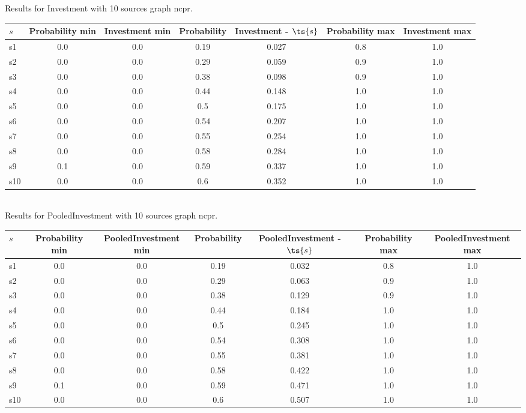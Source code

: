 \documentclass{article}
\begin{document}
\noindent Results for Investment with 10 sources graph ncpr.

\noindent\begin{tabular}{|l|c|c|c|c|c|c|}
\hline
$s$& Probability min & Investment min & Probability & Investment - $\ts{s}$ & Probability max & Investment max\\
\hline
s1 &0.0 & 0.0 & 0.19 & 0.027 & 0.8 & 1.0\\
\hline
s2 &0.0 & 0.0 & 0.29 & 0.059 & 0.9 & 1.0\\
\hline
s3 &0.0 & 0.0 & 0.38 & 0.098 & 0.9 & 1.0\\
\hline
s4 &0.0 & 0.0 & 0.44 & 0.148 & 1.0 & 1.0\\
\hline
s5 &0.0 & 0.0 & 0.5 & 0.175 & 1.0 & 1.0\\
\hline
s6 &0.0 & 0.0 & 0.54 & 0.207 & 1.0 & 1.0\\
\hline
s7 &0.0 & 0.0 & 0.55 & 0.254 & 1.0 & 1.0\\
\hline
s8 &0.0 & 0.0 & 0.58 & 0.284 & 1.0 & 1.0\\
\hline
s9 &0.1 & 0.0 & 0.59 & 0.337 & 1.0 & 1.0\\
\hline
s10 &0.0 & 0.0 & 0.6 & 0.352 & 1.0 & 1.0\\
\hline
\end{tabular}\\

\noindent Results for PooledInvestment with 10 sources graph ncpr.

\noindent\begin{tabular}{|l|c|c|c|c|c|c|}
\hline
$s$& Probability min & PooledInvestment min & Probability & PooledInvestment - $\ts{s}$ & Probability max & PooledInvestment max\\
\hline
s1 &0.0 & 0.0 & 0.19 & 0.032 & 0.8 & 1.0\\
\hline
s2 &0.0 & 0.0 & 0.29 & 0.063 & 0.9 & 1.0\\
\hline
s3 &0.0 & 0.0 & 0.38 & 0.129 & 0.9 & 1.0\\
\hline
s4 &0.0 & 0.0 & 0.44 & 0.184 & 1.0 & 1.0\\
\hline
s5 &0.0 & 0.0 & 0.5 & 0.245 & 1.0 & 1.0\\
\hline
s6 &0.0 & 0.0 & 0.54 & 0.308 & 1.0 & 1.0\\
\hline
s7 &0.0 & 0.0 & 0.55 & 0.381 & 1.0 & 1.0\\
\hline
s8 &0.0 & 0.0 & 0.58 & 0.422 & 1.0 & 1.0\\
\hline
s9 &0.1 & 0.0 & 0.59 & 0.471 & 1.0 & 1.0\\
\hline
s10 &0.0 & 0.0 & 0.6 & 0.507 & 1.0 & 1.0\\
\hline
\end{tabular}\\
\end{document}

